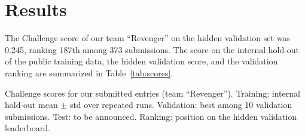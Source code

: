 \section{Results}
\label{sec:results}


The Challenge score of our team ``Revenger'' on the hidden validation set was 0.245, ranking 187th among 373 submissions. The score on the internal hold-out of the public training data, the hidden validation score, and the validation ranking are summarized in Table~\ref{tab:scores}.

\begin{table}[!htp]
\centering

\caption{Challenge scores for our submitted entries (team ``Revenger''). Training: internal hold-out mean $\pm$ std over repeated runs. Validation: best among 10 validation submissions. Test: to be announced. Ranking: position on the hidden validation leaderboard.}
\label{tab:scores}
\end{table}
